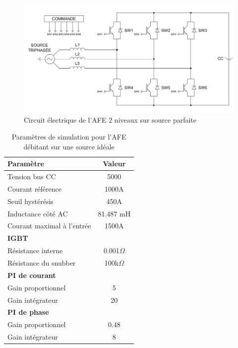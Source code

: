 \begin{figure}[htb]
\centering
\includegraphics[scale=0.6]{fig/AFE_IDEAL.png}
\caption{Circuit électrique de l'AFE 2 niveaux sur source parfaite}
\label{circuit_AFE_IDEAL}
\end{figure}


\begin{table}[htb]
\centering
\begin{tabular}{|l|c|} 
  \hline
  \textbf{Paramètre} & \textbf{Valeur}  \\
  \hline\hline
  Tension bus CC & 5000\\ \hline
  Courant référence & 1000A\\ \hline
  Seuil hystérésis & 450A\\ \hline
  Inductance côté AC& 81.487 mH\\ \hline
  Courant maximal à l'entrée& 1500A \\ \hline \hline
  \multicolumn{2}{|l|}{\textbf{IGBT}}\\ \hline
  Résistance interne & 0.001$\Omega$\\
  Résistance du snubber & 100k$\Omega$\\ \hline \hline
   \multicolumn{2}{|l|}{\textbf{PI de courant}}\\ \hline
  Gain proportionnel & 5 \\
  Gain intégrateur & 20 \\ \hline \hline
  \multicolumn{2}{|l|}{\textbf{PI de phase}}\\ \hline
  Gain proportionnel & 0.48 \\
  Gain intégrateur & 8 \\ \hline \hline
  \hline
\end{tabular}
\caption{Paramètres de simulation pour l'AFE débitant sur une source idéale}
\label{p_AF_ID}
\end{table}
\clearpage

